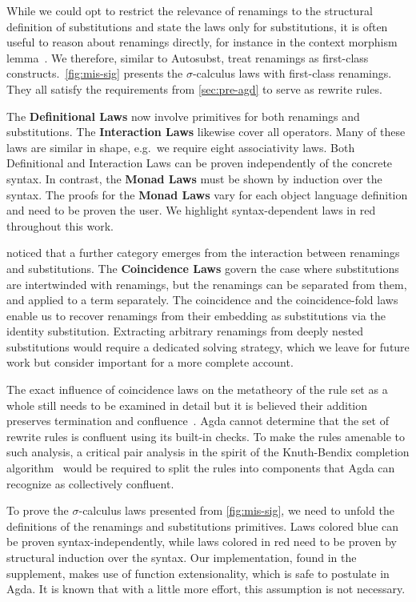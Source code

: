 \documentclass[screen,nonacm]{acmart}
\begin{document}
While we could opt to restrict the relevance of renamings to the structural
definition of substitutions and state the laws only for substitutions, it is
often useful to reason about renamings directly, for instance in the context
morphism lemma~\cite{goguen1997candidates}. We therefore, similar to Autosubst,
treat renamings as first-class constructs.\ \cref{fig:mis-sig} presents the
$σ$-calculus laws with first-class renamings. They all satisfy the requirements
from \cref{sec:pre-agd} to serve as rewrite rules.

The \textbf{Definitional Laws} now involve primitives for both renamings and
substitutions. The \textbf{Interaction Laws} likewise cover all operators. Many
of these laws are similar in shape, e.g.\ we require eight associativity laws.
Both Definitional and Interaction Laws can be proven independently of the
concrete syntax. In contrast, the \textbf{Monad Laws} must be shown by
induction over the syntax. The proofs for the \textbf{Monad Laws} vary for each
object language definition and need to be proven the user. We highlight
syntax-dependent laws in red throughout this work.

\citet{10.1145/3293880.3294101} noticed that a further category emerges from the interaction between
renamings and substitutions. The \textbf{Coincidence Laws} govern the case where
substitutions are intertwinded with renamings, but the renamings can be
separated from them, and applied to a term separately.
The coincidence and the coincidence-fold laws
enable us to recover renamings from their embedding as substitutions via the
identity substitution. Extracting arbitrary renamings from deeply nested substitutions would require a
dedicated solving strategy, which we leave for future work but consider
important for a more complete account.

The exact influence of coincidence laws on the metatheory of the rule set as a
whole still needs to be examined in detail but it is believed their addition
preserves termination and confluence~\cite{10.1145/3293880.3294101}. Agda
cannot determine that the set of rewrite rules is confluent using its built-in
checks. To make the rules amenable to such analysis, a critical pair analysis
in the spirit of the Knuth-Bendix completion algorithm~\cite{Knuth1983} would
be required to split the rules into components that Agda can recognize as
collectively confluent.

To prove the $σ$-calculus laws presented from \cref{fig:mis-sig}, we need to
unfold the definitions of the renamings and substitutions primitives. Laws
colored blue can be proven syntax-independently, while laws colored in red need
to be proven by structural induction over the syntax. Our implementation, found
in the supplement, makes use of function extensionality, which is safe to
postulate in Agda. It is known that with a little more effort, this assumption
is not necessary.
\end{document}

